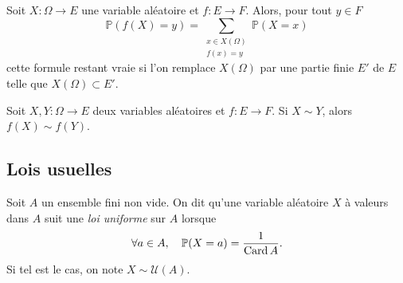 \documentclass{magnolia}
\begin{document}
\begin{remarqueUnique}
\remarque
Soit $X:\Omega\to E$ une variable aléatoire et $f:E\to F$. Alors, pour tout
$y\in F$
\[\mathbb{P}(f(X)=y)=\sum_{\substack{x\in X(\Omega)\\f(x)=y}} \mathbb{P}(X=x)\]
cette formule restant vraie si l'on remplace $X(\Omega)$ par une partie finie $E'$ de $E$
telle que $X(\Omega)\subset E'$.
\end{remarqueUnique}


\begin{proposition}
Soit $X,Y:\Omega\to E$ deux variables aléatoires et $f:E\to F$. Si $X\sim Y$, alors
$f(X)\sim f(Y)$.
\end{proposition}



\subsection{Lois usuelles}




\begin{definition}[nom={Loi uniforme}]
Soit $A$ un ensemble fini non vide. On dit qu'une variable aléatoire $X$ à valeurs dans $A$
suit une \emph{loi uniforme} sur $A$ lorsque
\[\forall a\in A,\quad \mathbb{P}(X=a)=\frac{1}{\operatorname{Card} A}.\]
Si tel est le cas, on note $X\sim\mathcal{U}(A)$.
\end{definition}
\end{document}
